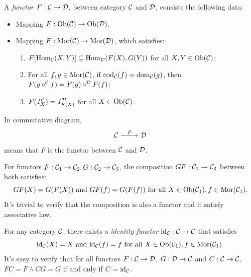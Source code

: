\documentclass{article}
\begin{document}
\begin{defi}\label{functor}
	A \emph{functor} $F:\mathcal{C}\to\mathcal{D}$, between category $\mathcal{C}$ and $\mathcal{D}$, consists the following data:
	\begin{itemize}
		\item Mapping $F:\mathrm{Ob}(\mathcal{C})\to\mathrm{Ob}(\mathcal{D})$.
		\item Mapping $F:\mathrm{Mor}(\mathcal{C})\to\mathrm{Mor}(\mathcal{D})$, which satisfies:
		\begin{enumerate}
			\item $F[\mathrm{Hom}_{\mathcal{C}}(X,Y)]\subseteq\mathrm{Hom}_{\mathcal{D}}(F(X),G(Y))$ for all $X,Y\in\mathrm{Ob}(\mathcal{C})$;
			\item For all $f,g\in\mathrm{Mor}(\mathcal{C})$, if $\mathrm{cod}_{\mathcal{C}}(f)=\mathrm{dom}_{\mathcal{C}}(g)$, then $F(g\circ^{\mathcal{C}} f)=F(g)\circ^{\mathcal{D}} F(f)$;
			\item $F(\mathit{1}^{\mathcal{C}}_X)=\mathit{1}^{\mathcal{D}}_{F(X)}$ for all $X\in\mathrm{Ob}(\mathcal{C})$.
		\end{enumerate}
	\end{itemize}
	
	In commutative diagram,
	\[\begin{tikzcd}
			\ca\arrow[r,"F"] & \D
	\end{tikzcd}\]
	means that $F$ is the functor between $\mathcal{C}$ and $\mathcal{D}$.
	
	For functors $F:\mathcal{C}_1\to\mathcal{C}_2,G:\mathcal{C}_2\to\mathcal{C}_3$, the composition $GF:\mathcal{C}_1\to\mathcal{C}_3$ between both satisfies:
		\[GF(X)=G(F(X))\ \text{and}\ GF(f)=G(F(f))\ \text{for all}\ X\in\Ob(\ca_1),f\in\Mor(\ca_1).\]
	It's trivial to verify that the composition is also a functor and it satisfy associative law.
	
	For any category $\mathcal{C}$, there exists a \emph{identity functor} $\mathrm{id}_{\mathcal{C}}:\mathcal{C}\to\mathcal{C}$ that satisfies
		\[\mathrm{id}_{\mathcal{C}}(X)=X\ \text{and}\ \mathrm{id}_{\mathcal{C}}(f)=f\ \text{for all}\ X\in\mathrm{Ob}(\mathcal{C}_1),f\in\mathrm{Mor}(\mathcal{C}_1).\]
	It's easy to verify that for all functors $F:\mathcal{C}\to\mathcal{D}$, $G:\mathcal{D}\to\mathcal{C}$ and $C:\mathcal{C}\to\mathcal{C}$, $FC=F\wedge CG=G$ if and only if $C=\mathrm{id}_{\mathcal{C}}$.
\end{defi}
\end{document}
